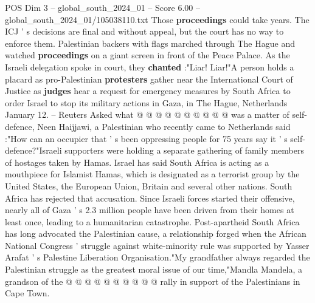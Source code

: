 \begin{textsample}{POS Dim 3 – global\_south\_2024\_01 – Score 6.00 – global\_south\_2024\_01/105038110.txt}
Those \textbf{proceedings} could take years.
The ICJ ' s decisions are final and without appeal, but the court has no way to enforce them.
Palestinian backers with flags marched through The Hague and watched \textbf{proceedings} on a giant screen in front of the Peace Palace.
As the Israeli delegation spoke in court, they \textbf{chanted} :"Liar!
Liar!"A person holds a placard as pro-Palestinian \textbf{protesters} gather near the International Court of Justice as \textbf{judges} hear a request for emergency measures by South Africa to order Israel to stop its military actions in Gaza, in The Hague, Netherlands January 12. -- Reuters Asked what @ @ @ @ @ @ @ @ @ @ was a matter of self-defence, Neen Haijjawi, a Palestinian who recently came to Netherlands said :"How can an occupier that ' s been oppressing people for 75 years say it ' s self-defence?"Israeli supporters were holding a separate gathering of family members of hostages taken by Hamas.
Israel has said South Africa is acting as a mouthpiece for Islamist Hamas, which is designated as a terrorist group by the United States, the European Union, Britain and several other nations.
South Africa has rejected that accusation.
Since Israeli forces started their offensive, nearly all of Gaza ' s 2.3 million people have been driven from their homes at least once, leading to a humanitarian catastrophe.
Post-apartheid South Africa has long advocated the Palestinian cause, a relationship forged when the African National Congress ' struggle against white-minority rule was supported by Yasser Arafat ' s Palestine Liberation Organisation."My grandfather always regarded the Palestinian struggle as the greatest moral issue of our time,"Mandla Mandela, a grandson of the @ @ @ @ @ @ @ @ @ @ rally in support of the Palestinians in Cape Town.

\end{textsample}
